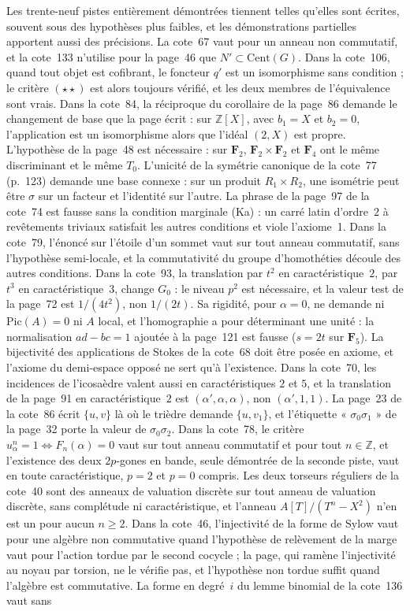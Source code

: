 Les trente-neuf pistes entièrement démontrées tiennent telles qu'elles sont écrites, souvent sous des hypothèses plus faibles, et les démonstrations partielles apportent aussi des précisions. La cote~67 vaut pour un anneau non commutatif, et la cote~133 n'utilise pour la page~46 que $N' \subset \mathrm{Cent}(G)$. Dans la cote~106, quand tout objet est cofibrant, le foncteur $q'$ est un isomorphisme sans condition ; le critère $(\star\star)$ est alors toujours vérifié, et les deux membres de l'équivalence sont vrais. Dans la cote~84, la réciproque du corollaire de la page~86 demande le changement de base que la page écrit : sur $\mathbb Z[X]$, avec $b_1 = X$ et $b_2 = 0$, l'application est un isomorphisme alors que l'idéal $(2, X)$ est propre. L'hypothèse  de la page~48 est nécessaire : sur $\mathbf F_2$, $\mathbf F_2 \times \mathbf F_2$ et $\mathbf F_4$ ont le même discriminant et le même $T_0$. L'unicité de la symétrie canonique de la cote~77 (p.~123) demande une base connexe : sur un produit $R_1 \times R_2$, une isométrie peut être $\sigma$ sur un facteur et l'identité sur l'autre. La phrase de la page~97 de la cote~74 est fausse sans la condition marginale (Ka) : un carré latin d'ordre~$2$ à revêtements triviaux satisfait les autres conditions et viole l'axiome~1. Dans la cote~79, l'énoncé sur l'étoile d'un sommet vaut sur tout anneau commutatif, sans l'hypothèse semi-locale, et la commutativité du groupe d'homothéties découle des autres conditions. Dans la cote~93, la translation par $t^2$ en caractéristique~$2$, par $t^3$ en caractéristique~$3$, change $G_0$ : le niveau $p^2$ est nécessaire, et la valeur test de la page~72 est $1/(4t^2)$, non $1/(2t)$. Sa rigidité, pour $\alpha = 0$, ne demande ni $\mathrm{Pic}(A) = 0$ ni $A$ local, et l'homographie a pour déterminant une unité : la normalisation $ad - bc = 1$ ajoutée à la page~121 est fausse ($s = 2t$ sur $\mathbf F_5$). La bijectivité des applications de Stokes de la cote~68 doit être posée en axiome, et l'axiome du demi-espace opposé ne sert qu'à l'existence. Dans la cote~70, les incidences de l'icosaèdre valent aussi en caractéristiques $2$ et $5$, et la translation de la page~91 en caractéristique~$2$ est $(\alpha', \alpha, \alpha)$, non $(\alpha', 1, 1)$. La page~23 de la cote~86 écrit $\{u, v\}$ là où le trièdre demande $\{u, v_1\}$, et l'étiquette « $\sigma_0\sigma_1$ » de la page~32 porte la valeur de $\sigma_0\sigma_2$. Dans la cote~78, le critère $u_\alpha^n = 1 \iff F_n(\alpha) = 0$ vaut sur tout anneau commutatif et pour tout $n \in \mathbb Z$, et l'existence des deux $2p$-gones en bande, seule démontrée de la seconde piste, vaut en toute caractéristique, $p = 2$ et $p = 0$ compris. Les deux torseurs réguliers de la cote~40 sont des anneaux de valuation discrète sur tout anneau de valuation discrète, sans complétude ni caractéristique, et l'anneau $A[T]/(T^n - X^2)$ n'en est un pour aucun $n \geq 2$. Dans la cote~46, l'injectivité de la forme de Sylow vaut pour une algèbre non commutative quand l'hypothèse de relèvement de la marge vaut pour l'action tordue par le second cocycle ; la page, qui ramène l'injectivité au noyau par torsion, ne le vérifie pas, et l'hypothèse non tordue suffit quand l'algèbre est commutative. La forme en degré~$i$ du lemme binomial de la cote~136 vaut sans 